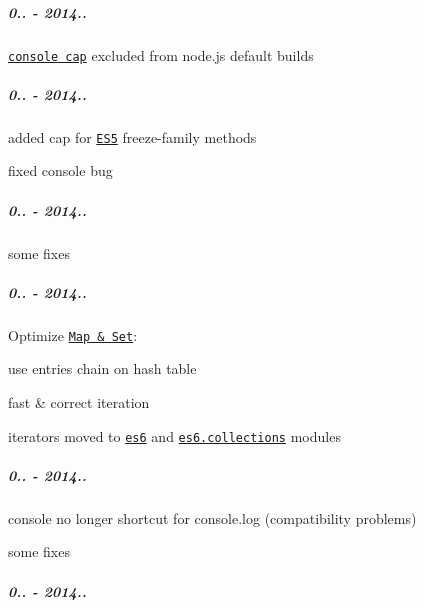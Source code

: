 \subparagraph*{0.. -\/ 2014..}


\begin{DoxyItemize}
\item \href{https://github.com/zloirock/core-js/#console}{\tt console cap} excluded from node.\+js default builds
\end{DoxyItemize}

\subparagraph*{0.. -\/ 2014..}


\begin{DoxyItemize}
\item added cap for \href{https://github.com/zloirock/core-js/#ecmascript-5}{\tt E\+S5} freeze-\/family methods
\item fixed {\ttfamily console} bug
\end{DoxyItemize}

\subparagraph*{0.. -\/ 2014..}


\begin{DoxyItemize}
\item some fixes
\end{DoxyItemize}

\subparagraph*{0.. -\/ 2014..}


\begin{DoxyItemize}
\item Optimize \href{https://github.com/zloirock/core-js/#ecmascript-6-collections}{\tt {\ttfamily Map} \& {\ttfamily Set}}\+:
\begin{DoxyItemize}
\item use entries chain on hash table
\item fast \& correct iteration
\item iterators moved to \href{https://github.com/zloirock/core-js/#ecmascript-6}{\tt {\ttfamily es6}} and \href{https://github.com/zloirock/core-js/#ecmascript-6-collections}{\tt {\ttfamily es6.\+collections}} modules
\end{DoxyItemize}
\end{DoxyItemize}

\subparagraph*{0.. -\/ 2014..}


\begin{DoxyItemize}
\item {\ttfamily console} no longer shortcut for {\ttfamily console.\+log} (compatibility problems)
\item some fixes
\end{DoxyItemize}

\subparagraph*{0.. -\/ 2014..}


